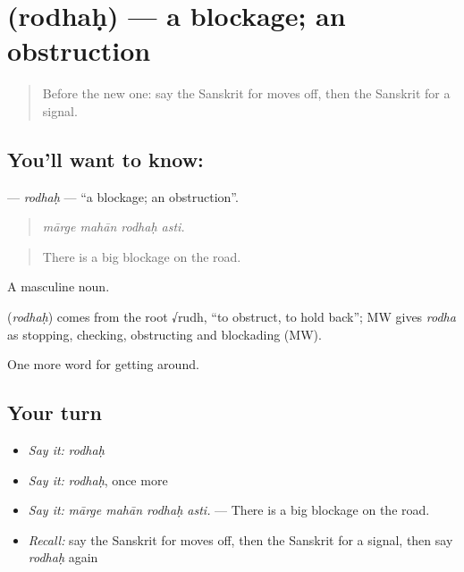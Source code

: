 \section[\texorpdfstring{\sk{रोधः} (rodhaḥ)}{रोधः (rodhaḥ)}]{ (rodhaḥ) — a blockage; an obstruction}

\label{lesson:SA-C411-rodhah}



\begin{quote}
Before the new one: say the Sanskrit for moves off, then the Sanskrit for a signal.
\end{quote}

\subsection*{You'll want to know: }
\textbf{} — \emph{rodhaḥ} — \textquotedblleft{}a blockage; an obstruction\textquotedblright{}.

\begin{quote}
   
\end{quote}

\begin{quote}
\emph{mārge mahān rodhaḥ asti.}
\end{quote}

\begin{quote}
There is a big blockage on the road.
\end{quote}

A masculine noun.

\begin{cousinweb}
\textbf{} (\emph{rodhaḥ}) comes from the root √rudh, \textquotedblleft{}to obstruct, to hold back\textquotedblright{}; MW gives \emph{rodha} as stopping, checking, obstructing and blockading (MW).
\end{cousinweb}

\begin{grammarlens}[title={What you've built}]
One more word for getting around.
\end{grammarlens}

\subsection*{Your turn}
\begin{itemize}
\raggedright
  \item \emph{Say it:} \emph{rodhaḥ}
  \item \emph{Say it:} \emph{rodhaḥ}, once more
  \item \emph{Say it:} \emph{mārge mahān rodhaḥ asti.} — There is a big blockage on the road.
  \item \emph{Recall:} say the Sanskrit for moves off, then the Sanskrit for a signal, then say \emph{rodhaḥ} again
\end{itemize}

